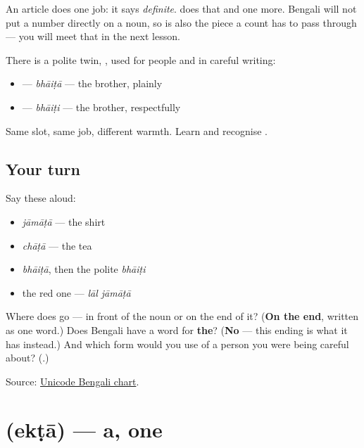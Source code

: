 \begin{grammarlens}[title={Grammar Lens: why this is called a classifier and not an article}]
An article does one job: it says \emph{definite}. \textbf{} does that and one more. Bengali will not put a number directly on a noun, so \textbf{} is also the piece a count has to pass through — you will meet that in the next lesson.

There is a polite twin, \textbf{}, used for people and in careful writing:

\begin{itemize}
\raggedright
  \item \textbf{} — \emph{bhāiṭā} — the brother, plainly
  \item \textbf{} — \emph{bhāiṭi} — the brother, respectfully
\end{itemize}

Same slot, same job, different warmth. Learn \textbf{} and recognise \textbf{}.
\end{grammarlens}

\subsection*{Your turn}
Say these aloud:

\begin{itemize}
\raggedright
  \item \emph{jāmāṭā} — the shirt
  \item \emph{chāṭā} — the tea
  \item \emph{bhāiṭā}, then the polite \emph{bhāiṭi}
  \item the red one — \emph{lāl jāmāṭā}
\end{itemize}

\begin{tcolorbox}[breakable,colback=teal!4,colframe=teal!35!black,title={Before you move on}]
Where does \textbf{} go — in front of the noun or on the end of it? (\textbf{On the end}, written as one word.) Does Bengali have a word for \textbf{the}? (\textbf{No} — this ending is what it has instead.) And which form would you use of a person you were being careful about? (\textbf{}.)

Source: \href{https://www.unicode.org/charts/PDF/U0980.pdf}{Unicode Bengali chart}.
\end{tcolorbox}
\section[\texorpdfstring{\bn{একটা} (ekṭā)}{একটা (ekṭā)}]{ (ekṭā) — a, one}

